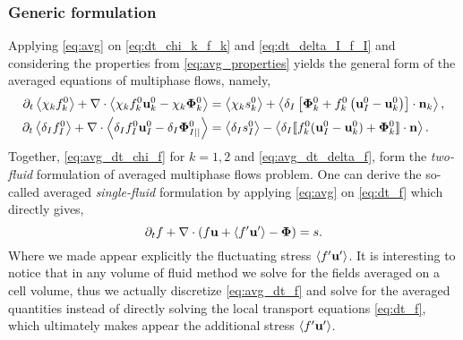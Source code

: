 \subsubsection{Generic formulation}
Applying \ref{eq:avg} on \ref{eq:dt_chi_k_f_k} and \ref{eq:dt_delta_I_f_I} and considering the properties from \ref{eq:avg_properties} yields the general form of the averaged equations of multiphase flows, namely,
\begin{align}
    \partial_t \left<\chi_k f_k^0\right>
    +\mathbf{\nabla}\cdot \left<\chi_k f_k^0 \textbf{u}_k^0 - \chi_k \mathbf{\Phi}_k^0\right>
    &= 
    \left<\chi_k s_k^0\right>
    + \left<\delta_I\left[
        \mathbf{\Phi}_k^0
        + f_k^0
        \left(
            \textbf{u}_I^0
            - \textbf{u}_k^0
        \right)
    \right]
    \cdot \textbf{n}_k\right> ,
    \label{eq:avg_dt_chi_f}\\
    \partial_t \left<\delta_If_I^0\right>
    +\mathbf{\nabla}\cdot \left<\delta_I f_I^0 \textbf{u}_I^0-\delta_I \mathbf{\Phi}_{I||}^0 \right>
    &= 
    \left<\delta_Is_I^0\right> 
    - \left<\delta_I \llbracket 
    f_k^0 (\textbf{u}_I^0 - \textbf{u}_k^0)
    + \mathbf{\Phi}_k^0
     \rrbracket \cdot \textbf{n} \right>.
    \label{eq:avg_dt_delta_f}
\end{align}
Together, \ref{eq:avg_dt_chi_f} for $k=1,2$  and \ref{eq:avg_dt_delta_f}, form the \textit{two-fluid} formulation of averaged multiphase flows problem. 
One can derive the so-called averaged \textit{single-fluid} formulation by applying \ref{eq:avg} on \ref{eq:dt_f} which directly gives, 
\begin{equation}
    \partial_t f
    + \mathbf{\nabla}\cdot (f \textbf{u} + \left<f'\textbf{u}'\right> - \mathbf{\Phi})
    = 
    s.
    \label{eq:avg_dt_f}
\end{equation}
Where we made appear explicitly the fluctuating stress $\left<f'\textbf{u}'\right>$. 
It is interesting to notice that in any volume of fluid method we solve for the fields averaged on a cell volume, thus we actually discretize \ref{eq:avg_dt_f} and solve for the averaged quantities instead of directly solving the local transport equations \ref{eq:dt_f}, which ultimately makes appear the additional stress $\left<f'\textbf{u}'\right>$.

